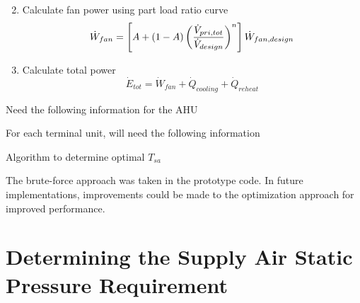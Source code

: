 \begin{enumerate}
\begin{equation}
        \end{equation}
    \item Calculate fan power using part load ratio curve
        \begin{equation}\label{eq:TotalFanPower}
            \dot{W}_{fan} = \left[A + \left(1-A\right)\left(\frac{\dot{V}_{pri,tot}}{\dot{V}_{design}}\right)^{n}\right] \dot{W}_{fan,design} 
        \end{equation}
    \item Calculate total power 
        \begin{equation}\label{eq:TotalPowerSystem}
            \dot{E}_{tot} = \dot{W}_{fan} + \dot{Q}_{cooling} + \dot{Q}_{reheat}
        \end{equation}
\end{enumerate}

\begin{algorithm}
\SetAlgoLined
Need the following information for the AHU\par
{}
For each terminal unit, will need the following information \par
{}



\caption{Algorithm to determine optimal \(T_{sa}\)}
\end{algorithm}


The brute-force approach was taken in the prototype code. In future implementations,
improvements could be made to the optimization approach for improved
performance.

\section{Determining the Supply Air Static Pressure Requirement}

